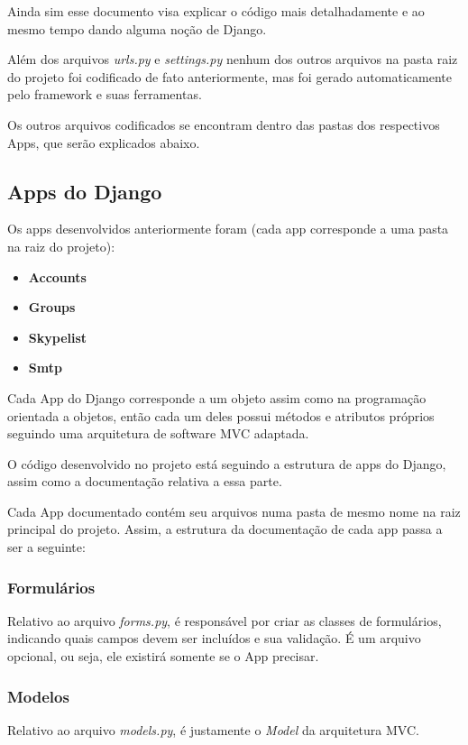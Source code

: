 \documentclass[letterpaper,10pt,brazil]{sphinxmanual}
\begin{document}
Ainda sim esse documento visa explicar o código mais detalhadamente e ao mesmo tempo dando alguma noção de Django.

Além dos arquivos \emph{urls.py} e \emph{settings.py} nenhum dos outros arquivos na pasta raiz do projeto foi codificado de fato anteriormente, mas foi gerado automaticamente pelo framework e suas ferramentas.

Os outros arquivos codificados se encontram dentro das pastas dos respectivos Apps, que serão explicados abaixo.


\subsection{Apps do Django}
\label{codigo:apps-do-django}
Os apps desenvolvidos anteriormente foram (cada app corresponde a uma pasta na raiz do projeto):
\begin{itemize}
\item {} 
\textbf{Accounts}

\item {} 
\textbf{Groups}

\item {} 
\textbf{Skypelist}

\item {} 
\textbf{Smtp}

\end{itemize}

Cada App do Django corresponde a um objeto assim como na programação orientada a objetos, então cada um deles possui métodos e atributos próprios seguindo uma arquitetura de software MVC adaptada.

O código desenvolvido no projeto está seguindo a estrutura de apps do Django, assim como a documentação relativa a essa parte.

Cada App documentado contém seu arquivos numa pasta de mesmo nome na raiz principal do projeto. Assim, a estrutura da documentação de cada app passa a ser a seguinte:


\subsubsection{Formulários}
\label{codigo:formularios}
Relativo ao arquivo \emph{forms.py}, é responsável por criar as classes de formulários, indicando quais campos devem ser incluídos e sua validação. É um arquivo opcional, ou seja, ele existirá somente se o App precisar.


\subsubsection{Modelos}
\label{codigo:modelos}
Relativo ao arquivo \emph{models.py}, é justamente o \emph{Model} da arquitetura MVC.
\end{document}
